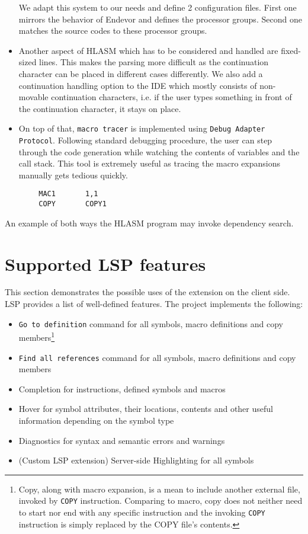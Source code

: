 \begin{itemize}
We adapt this system to our needs and define 2 configuration files. First one mirrors the behavior of Endevor and defines the processor groups. Second one matches the source codes to these processor groups.

\item Another aspect of HLASM which has to be considered and handled are fixed-sized lines. This makes the parsing more difficult as the continuation character can be placed in different cases differently. We also add a continuation handling option to the IDE which mostly consists of non-movable continuation characters, i.e. if the user types something in front of the continuation character, it stays on place.

\item On top of that, \texttt{macro tracer} is implemented using \texttt{Debug Adapter Protocol}. Following standard debugging procedure, the user can step through the code generation while watching the contents of variables and the call stack. This tool is extremely useful as tracing the macro expansions manually gets tedious quickly.
\end{itemize}

\pagebreak
\begin{listing}
\begin{verbatim}
        MAC1       1,1                   
        COPY       COPY1
\end{verbatim} 
\caption{An example of both ways the HLASM program may invoke dependency search.}
\label{lst:search}
\end{listing}

\section{Supported LSP features}
This section demonstrates the possible uses of the extension on the client side. LSP provides a list of well-defined features. The project implements the following:

\begin{itemize}
	\item \texttt{Go to definition} command for all symbols, macro definitions and copy members\footnote{Copy, along with macro expansion, is a mean to include another external file, invoked by \texttt{COPY} instruction. Comparing to macro, copy does not neither need to start nor end with any specific instruction and the invoking \texttt{COPY} instruction is simply replaced by the COPY file's contents.}
	\item \texttt{Find all references} command for all symbols, macro definitions and copy members
	\item Completion for instructions, defined symbols and macros
	\item Hover for symbol attributes, their locations, contents and other useful information depending on the symbol type
	\item Diagnostics for syntax and semantic errors and warnings
	\item (Custom LSP extension) Server-side Highlighting for all symbols  
\end{itemize}

